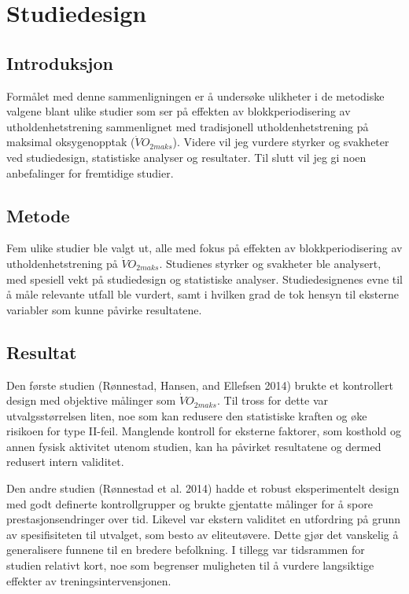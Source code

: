 \documentclass[
  letterpaper,
  DIV=11,
  numbers=noendperiod]{scrreprt}
\begin{document}

\chapter{Studiedesign}\label{studiedesign}

\section{Introduksjon}\label{introduksjon-2}

Formålet med denne sammenligningen er å undersøke ulikheter i de
metodiske valgene blant ulike studier som ser på effekten av
blokkperiodisering av utholdenhetstrening sammenlignet med tradisjonell
utholdenhetstrening på maksimal oksygenopptak (\(\dot{V}O_{2maks}\)).
Videre vil jeg vurdere styrker og svakheter ved studiedesign,
statistiske analyser og resultater. Til slutt vil jeg gi noen
anbefalinger for fremtidige studier.

\section{Metode}\label{metode-4}

Fem ulike studier ble valgt ut, alle med fokus på effekten av
blokkperiodisering av utholdenhetstrening på \(\dot{V}O_{2maks}\).
Studienes styrker og svakheter ble analysert, med spesiell vekt på
studiedesign og statistiske analyser. Studiedesignenes evne til å måle
relevante utfall ble vurdert, samt i hvilken grad de tok hensyn til
eksterne variabler som kunne påvirke resultatene.

\section{Resultat}\label{resultat-4}

Den første studien (Rønnestad, Hansen, and Ellefsen 2014) brukte et
kontrollert design med objektive målinger som \(\dot{V}O_{2maks}\). Til
tross for dette var utvalgsstørrelsen liten, noe som kan redusere den
statistiske kraften og øke risikoen for type II-feil. Manglende kontroll
for eksterne faktorer, som kosthold og annen fysisk aktivitet utenom
studien, kan ha påvirket resultatene og dermed redusert intern
validitet.

Den andre studien (Rønnestad et al. 2014) hadde et robust eksperimentelt
design med godt definerte kontrollgrupper og brukte gjentatte målinger
for å spore prestasjonsendringer over tid. Likevel var ekstern validitet
en utfordring på grunn av spesifisiteten til utvalget, som besto av
eliteutøvere. Dette gjør det vanskelig å generalisere funnene til en
bredere befolkning. I tillegg var tidsrammen for studien relativt kort,
noe som begrenser muligheten til å vurdere langsiktige effekter av
treningsintervensjonen.
\end{document}
